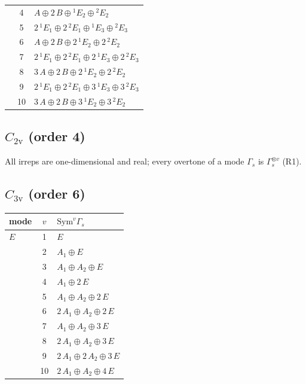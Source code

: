 \documentclass[11pt]{article}
\begin{document}
\begin{longtable}{l c p{}}
 & 4 & $A\oplus 2\,B\oplus {}^{1}E_{2}\oplus {}^{2}E_{2}$\\
 & 5 & $2\,{}^{1}E_{1}\oplus 2\,{}^{2}E_{1}\oplus {}^{1}E_{3}\oplus {}^{2}E_{3}$\\
 & 6 & $A\oplus 2\,B\oplus 2\,{}^{1}E_{2}\oplus 2\,{}^{2}E_{2}$\\
 & 7 & $2\,{}^{1}E_{1}\oplus 2\,{}^{2}E_{1}\oplus 2\,{}^{1}E_{3}\oplus 2\,{}^{2}E_{3}$\\
 & 8 & $3\,A\oplus 2\,B\oplus 2\,{}^{1}E_{2}\oplus 2\,{}^{2}E_{2}$\\
 & 9 & $2\,{}^{1}E_{1}\oplus 2\,{}^{2}E_{1}\oplus 3\,{}^{1}E_{3}\oplus 3\,{}^{2}E_{3}$\\
 & 10 & $3\,A\oplus 2\,B\oplus 3\,{}^{1}E_{2}\oplus 3\,{}^{2}E_{2}$\\
\hline
\end{longtable}

\subsection*{$C_{2\mathrm{v}}$ \quad (order 4)}
All irreps are one-dimensional and real; every overtone of a mode $\Gamma_s$ is $\Gamma_s^{\otimes v}$ (R1).

\subsection*{$C_{3\mathrm{v}}$ \quad (order 6)}
\begin{longtable}{l c p{}}
\hline mode & $v$ & $\mathrm{Sym}^v\Gamma_s$\\ \hline\endhead
$E$ & 1 & $E$\\
 & 2 & $A_{1}\oplus E$\\
 & 3 & $A_{1}\oplus A_{2}\oplus E$\\
 & 4 & $A_{1}\oplus 2\,E$\\
 & 5 & $A_{1}\oplus A_{2}\oplus 2\,E$\\
 & 6 & $2\,A_{1}\oplus A_{2}\oplus 2\,E$\\
 & 7 & $A_{1}\oplus A_{2}\oplus 3\,E$\\
 & 8 & $2\,A_{1}\oplus A_{2}\oplus 3\,E$\\
 & 9 & $2\,A_{1}\oplus 2\,A_{2}\oplus 3\,E$\\
 & 10 & $2\,A_{1}\oplus A_{2}\oplus 4\,E$\\
\hline
\end{longtable}
\end{document}
